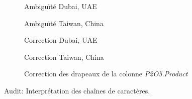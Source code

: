 	\begin{figure}[H]
	\begin{subfigure}{.5\textwidth}
			\centering
			\caption{Ambiguïté Dubai, UAE}
			\label{fig:dubai}
	\end{subfigure}
	\begin{subfigure}{.5\textwidth}
		\centering
		\caption{Ambiguïté Taiwan, China}
		\label{fig:taiwan}
	\end{subfigure}
	\begin{subfigure}{\linewidth}
			\centering
			\caption{Correction Dubai, UAE}
			\label{fig:corrDubai}
	\end{subfigure}
	\begin{subfigure}{\linewidth}
			\centering
			\caption{Correction Taiwan, China}
			\label{fig:corrTaiwan}
	\end{subfigure}
		\begin{subfigure}{\linewidth}
			\centering
			\caption{Correction des drapeaux de la colonne \textit{P2O5.Product}}
			\label{fig:corr}
		\end{subfigure}
			\caption{Audit: Interprétation des chaînes de caractères.}
			\end{figure}
